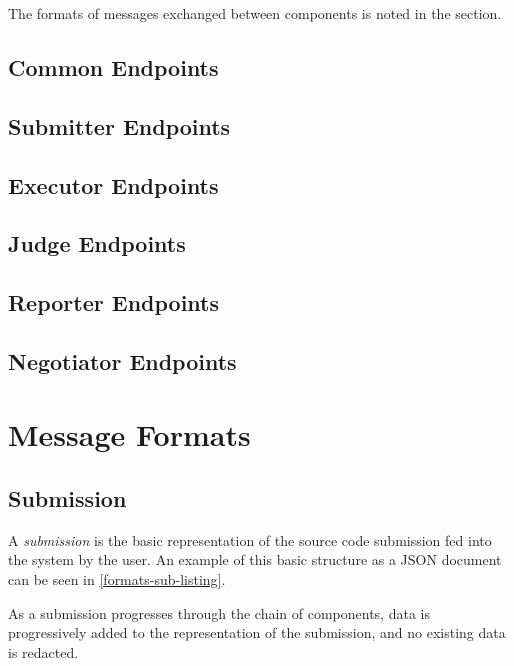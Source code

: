 \documentclass[11pt,letterpaper]{article}
\begin{document}
The formats of messages exchanged between components is noted in the
 section.

\subsection{Common Endpoints}
\label{endpoints-common}

\subsection{Submitter Endpoints}
\label{endpoints-sub}

\subsection{Executor Endpoints}
\label{endpoints-exec}

\subsection{Judge Endpoints}
\label{endpoints-judge}

\subsection{Reporter Endpoints}
\label{endpoints-report}

\subsection{Negotiator Endpoints}
\label{endpoints-hub}

\section{Message Formats}
\label{formats}

\subsection{Submission}
\label{formats-sub}

A \emph{submission} is the basic representation of the source code submission
fed into the system by the user. An example of this basic structure as a JSON
document can be seen in \autoref{formats-sub-listing}.

As a submission progresses through the chain of components, data is
progressively added to the representation of the submission, and no existing
data is redacted.
\end{document}
